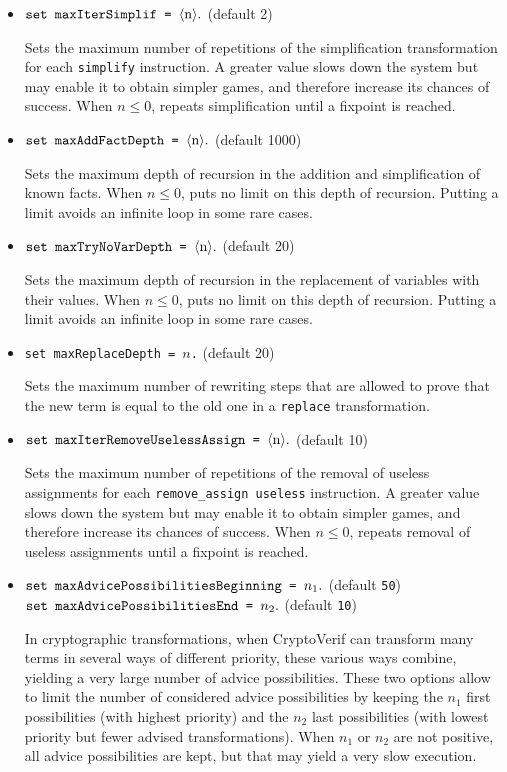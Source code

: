 \begin{itemize}
\begin{itemize}
\item $\texttt{set maxIterSimplif = }\langle\textrm{n}\rangle{\tt .}$ (default 2)

Sets the maximum number of repetitions of the simplification transformation
for each {\tt simplify} instruction.
A greater value slows down the system but may enable it to obtain
simpler games, and therefore increase its chances of success.
When $n \leq 0$, repeats simplification until a fixpoint is reached.

\item $\texttt{set maxAddFactDepth = }\langle\textrm{n}\rangle{\tt .}$ (default 1000)

Sets the maximum depth of recursion in the addition and simplification
of known facts. 
When $n \leq 0$, puts no limit on this depth of recursion.
Putting a limit avoids an infinite loop in some rare cases.

\item $\texttt{set maxTryNoVarDepth = }\langle\textrm{n}\rangle{\tt .}$ (default 20)

Sets the maximum depth of recursion in the replacement of
variables with their values.
When $n \leq 0$, puts no limit on this depth of recursion.
Putting a limit avoids an infinite loop in some rare cases.

\item \texttt{set maxReplaceDepth = $n$.} (default 20)

Sets the maximum number of rewriting steps that are allowed 
to prove that the new term is equal to the old one in a 
\texttt{replace} transformation. 

\item $\texttt{set maxIterRemoveUselessAssign = }\langle\textrm{n}\rangle{\tt .}$ (default 10)

Sets the maximum number of repetitions of the removal of useless assignments 
for each {\tt remove\string_assign useless} instruction.
A greater value slows down the system but may enable it to obtain
simpler games, and therefore increase its chances of success.
When $n \leq 0$, repeats removal of useless assignments until a fixpoint 
is reached.

\item $\texttt{set maxAdvicePossibilitiesBeginning = }n_1{\tt .}$ (default \texttt{50})\\
$\texttt{set maxAdvicePossibilitiesEnd = }n_2{\tt .}$ (default \texttt{10})

In cryptographic transformations, when CryptoVerif can transform many terms in several ways of different priority, these various ways combine, yielding a very large number of advice possibilities. These two options allow to limit the number of considered advice possibilities by keeping the $n_1$ first possibilities (with highest priority) and the $n_2$ last possibilities (with lowest priority but fewer advised transformations). When $n_1$ or $n_2$ are not positive, all advice possibilities are kept, but that may yield a very slow execution. 


\end{itemize}
\end{itemize}
